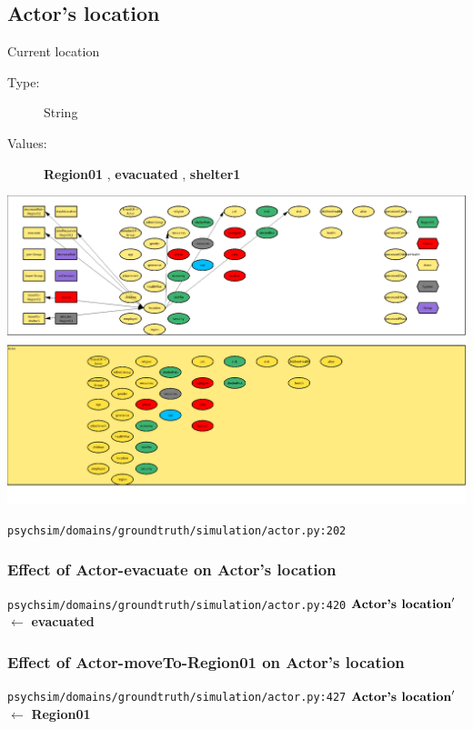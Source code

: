 \documentclass{article}%
\begin{document}
%
\subsection{Actor's location}%
\label{subsec:Actor's location}%
Current location%
\begin{description}%
\item[Type:]%
String%
\item[Values:]%
\textbf{Region01}%
, %
\textbf{evacuated}%
, %
\textbf{shelter1}%
\end{description}%
\includegraphics[width=\textwidth]{images/locationOfActor.png}%
\begin{flushleft}%
\verb|psychsim/domains/groundtruth/simulation/actor.py:202|%
\end{flushleft}%
\subsubsection{Effect of Actor{-}evacuate on Actor's location}%
\label{ssubsec:Effect of Actor{-}evacuate on Actor's location}%
\begin{flushleft}%
\verb|psychsim/domains/groundtruth/simulation/actor.py:420|%
\linebreak%
$\mbox{\textbf{Actor's location}} '$%
$\leftarrow$%
\textbf{evacuated}%
\end{flushleft}

%
\subsubsection{Effect of Actor{-}moveTo{-}Region01 on Actor's location}%
\label{ssubsec:Effect of Actor{-}moveTo{-}Region01 on Actor's location}%
\begin{flushleft}%
\verb|psychsim/domains/groundtruth/simulation/actor.py:427|%
\linebreak%
$\mbox{\textbf{Actor's location}} '$%
$\leftarrow$%
\textbf{Region01}%
\end{flushleft}
\end{document}

